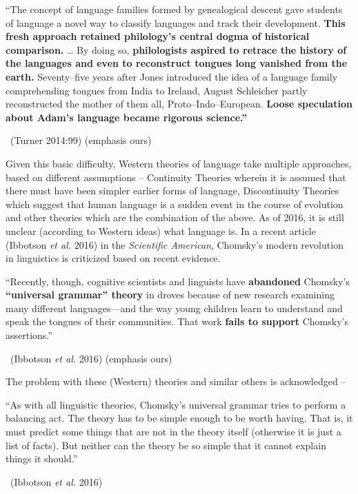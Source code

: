 \begin{myquote}
“The concept of language families formed by genealogical descent gave students of language a novel way to classify languages and track their development. \textbf{This fresh approach retained philology’s central dogma of historical comparison.} … By doing so, \textbf{philologists aspired to retrace the history of the languages and even to reconstruct tongues long vanished from the earth.} Seventy–five years after Jones introduced the idea of a language family comprehending tongues from India to Ireland, August Schleicher partly reconstructed the mother of them all, Proto–Indo–European. \textbf{Loose speculation about Adam’s language became rigorous science.”}

~\hfill (Turner 2014:99) (emphasis ours)
\end{myquote}

Given this basic difficulty, Western theories of language take multiple approaches, based on different assumptions – Continuity Theories wherein it is assumed that there must have been simpler earlier forms of language, Discontinuity Theories which suggest that human language is a sudden event in the course of evolution and other theories which are the combination of the above. As of 2016, it is still unclear (according to Western ideas) what language is. In a recent article (Ibbotson \textit{et al.} 2016) in the \textit{Scientific American}, Chomsky’s modern revolution in linguistics is criticized based on recent evidence.

\begin{myquote}
“Recently, though, cognitive scientists and linguists have \textbf{abandoned } Chomsky’s \textbf{“universal grammar” theory} in droves because of new research examining many different languages—and the way young children learn to understand and speak the tongues of their communities. That work \textbf{fails to support} Chomsky’s assertions.”

~\hfill (Ibbotson \textit{et al.} 2016) (emphasis ours)
\end{myquote}

The problem with these (Western) theories and similar others is acknowledged –

\begin{myquote}
“As with all linguistic theories, Chomsky’s universal grammar tries to perform a balancing act. The theory has to be simple enough to be worth having. That is, it must predict some things that are not in the theory itself (otherwise it is just a list of facts). But neither can the theory be so simple that it cannot explain things it should.”

~\hfill (Ibbotson \textit{et al.} 2016)
\end{myquote}

